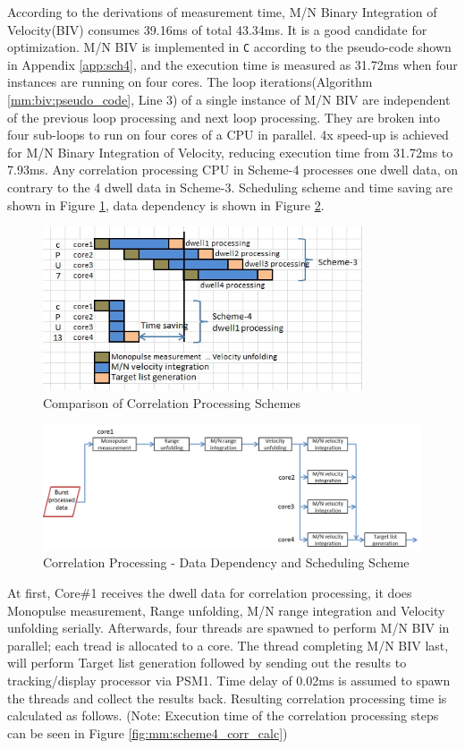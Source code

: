 According to the derivations of measurement time, M/N Binary Integration of Velocity(BIV) consumes 39.16ms of total 43.34ms. It is a good candidate for optimization. M/N BIV is implemented in \verb|C| according to the pseudo-code shown in Appendix \ref{app:sch4}, and the execution time is measured as 31.72ms when four instances are running on four cores. The loop iterations(Algorithm \ref{mm:biv:pseudo_code}, Line 3) of a single instance of M/N BIV are independent of the previous loop processing and next loop processing. They are broken into four sub-loops to run on four cores of a CPU in parallel. 4x speed-up is achieved for M/N Binary Integration of Velocity, reducing execution time from 31.72ms to 7.93ms. Any correlation processing CPU in Scheme-4 processes one dwell data, on contrary to the 4 dwell data in Scheme-3. Scheduling scheme and time saving are shown in Figure \ref{fig:mm:scheme5_corr_dd}, data dependency is shown in Figure \ref{fig:mm:scheme5_corr_data_path}.

\begin{figure}[h!]
	\centering
	\includegraphics[width=95mm]{figures/scheme5_corr_dd}
	\caption{Comparison of Correlation Processing Schemes}
	\label{fig:mm:scheme5_corr_dd}
\end{figure}

\begin{figure}[h!]
	\centering
	\includegraphics[width=140mm]{figures/scheme5_corr_data_path}
	\caption{Correlation Processing - Data Dependency and Scheduling Scheme}
	\label{fig:mm:scheme5_corr_data_path}
\end{figure}
At first, Core\#1 receives the dwell data for correlation processing, it does Monopulse measurement, Range unfolding, M/N range integration and Velocity unfolding serially. Afterwards, four threads are spawned to perform M/N BIV in parallel; each tread is allocated to a core. The thread completing M/N BIV last, will perform Target list generation followed by sending out the results to tracking/display processor via PSM1. Time delay of 0.02ms is assumed to spawn the threads and collect the results back. Resulting correlation processing time is calculated as follows. (Note: Execution time of the correlation processing steps can be seen in Figure \ref{fig:mm:scheme4_corr_calc})

